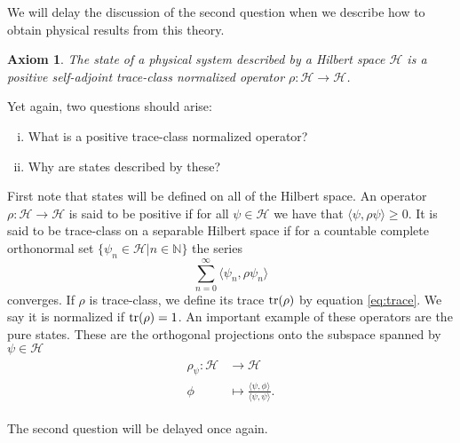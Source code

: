 \documentclass{article}
\newtheorem{axiom}{Axiom}
\begin{document}
We will delay the discussion of the second question when we describe how to obtain physical results from this theory.

\begin{axiom}
The state of a physical system described by a Hilbert space $\mathcal{H}$ is a positive self-adjoint trace-class normalized operator $\rho:\mathcal{H}\rightarrow\mathcal{H}$.
\end{axiom}

Yet again, two questions should arise:
\begin{enumerate}[(i)]
\item What is a positive trace-class normalized operator?
\item Why are states described by these?
\end{enumerate}

First note that states will be defined on all of the Hilbert space. An operator $\rho:\mathcal{H}\rightarrow\mathcal{H}$ is said to be positive if for all $\psi\in\mathcal{H}$ we have that $\langle\psi,\rho\psi\rangle\geq 0$. It is said to be trace-class on a separable Hilbert space if for a countable complete orthonormal set $\{\psi_n\in\mathcal{H}|n\in\mathbb{N}\}$ the series
\begin{equation}\label{eq:trace}
\sum_{n=0}^\infty \langle\psi_n,\rho\psi_n\rangle
\end{equation}
converges. If $\rho$ is trace-class, we define its trace $\tr(\rho)$ by equation \eqref{eq:trace}. We say it is normalized if $\tr(\rho)=1$. An important example of these operators are the pure states. These are the orthogonal projections onto the subspace spanned by $\psi\in\mathcal{H}$
\begin{align}
\begin{split}
\rho_\psi:\mathcal{H}&\rightarrow\mathcal{H}\\
\phi&\mapsto\frac{\langle\psi,\phi\rangle}{\langle\psi,\psi\rangle}.
\end{split}
\end{align}

The second question will be delayed once again.



\end{document}
